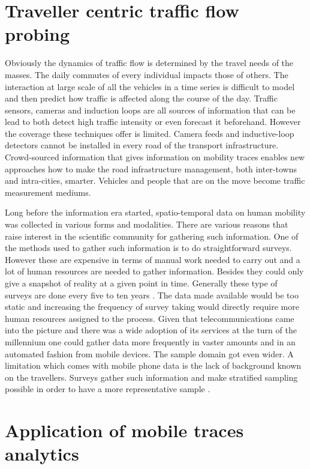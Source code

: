 \documentclass[12pt, a4paper]{report}
\theoremstyle{definition}
\theoremstyle{definition}%
\theoremstyle{definition}%
\theoremstyle{definition}%
\theoremstyle{definition}%
\theoremstyle{definition}%
\begin{document}
\section{Traveller centric traffic flow probing}

Obviously the dynamics of traffic flow is determined by the travel needs of the masses. The daily commutes of every individual impacts those of others. The interaction at large scale of all the vehicles in a time series is difficult to model and then predict how traffic is affected along the course of the day. Traffic sensors, cameras and induction loops are all sources of information that can be lead to both detect high traffic intensity or even forecast it beforehand.  However the coverage these techniques offer is limited. Camera feeds and inductive-loop detectors cannot be installed in every road of the transport infrastructure. Crowd-sourced information that gives information on mobility traces enables new approaches how to make the road infrastructure management, both inter-towns and intra-cities, smarter. Vehicles and people that are on the move become traffic measurement mediums.

Long before the information era started, spatio-temporal data on human mobility was collected in various forms and modalities. There are various reasons that raise interest in the scientific community for gathering such information. One of the methods used to gather such information is to do straightforward surveys\cite{Calabrese2013,Colak2015}. However these are expensive in terms of manual work needed to carry out and a lot of human resources are needed to gather information. Besides they could only give a snapshot of reality at a given point in time.  Generally these type of surveys are done every five to ten years \cite{Toole2015}. The data made available would be too static and increasing the frequency of survey taking would directly require more human resources assigned to the process. Given that telecommunications came into the picture and there was a wide adoption of its services at the turn of the millennium one could gather data more frequently in vaster amounts and in an automated fashion from mobile devices. The sample domain got even wider. A limitation which comes with mobile phone data is the lack of background known on the travellers. Surveys gather such information and make stratified sampling possible in order to have a more representative sample \cite{Colak2015}.

\section{Application of mobile traces analytics}
\end{document}
